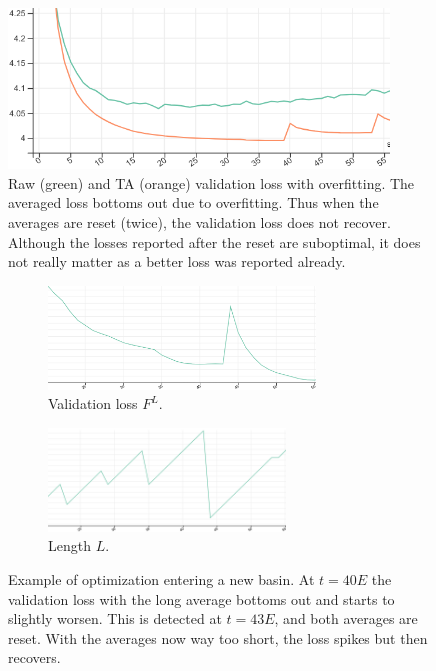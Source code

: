 \documentclass[twocolumn]{article}
\newcommand{\tta}{\textlf{2}TA}
\begin{document}
\begin{figure}[t]
  \centering
  \includegraphics[width=0.9\textwidth]{figure/overfitting.png}
  \caption[Raw and \tta{} validation loss with overfitting.]{Raw (green) and \tta{} (orange) validation loss with overfitting.
The averaged loss bottoms out due to overfitting.
Thus when the averages are reset (twice), the validation loss does not recover.
Although the losses reported after the reset are suboptimal, it does not really matter as a better loss was reported already.}
  \label{fig:overfitting}
\end{figure}

\begin{figure}[t]
  \begin{subfigure}{0.52\textwidth}
    \includegraphics[width=\linewidth,height=2.75cm,clip]{figure/new-basin.png}
    \caption{Validation loss $F^L$.}
  \end{subfigure}
  \hfill
  \begin{subfigure}{0.45\textwidth}
    \includegraphics[width=\linewidth,height=2.75cm,clip]
                    {figure/new-basin-samples.png}
    \caption{Length $L$.}
  \end{subfigure}
  \caption[Example of optimization entering a new basin.]{Example of optimization entering a new basin.
At $t=40E$ the validation loss with the long average bottoms out and starts to slightly worsen.
This is detected at $t=43E$, and both averages are reset.
With the averages now way too short, the loss spikes but then recovers.}
  \label{fig:new-basin}
\end{figure}
\end{document}
